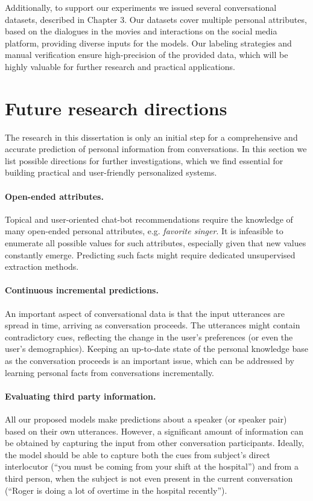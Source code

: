 \documentclass[11pt, oneside]{book}
\begin{document}
Additionally, to support our experiments we issued several conversational datasets, described in Chapter 3. Our datasets cover multiple personal attributes, based on the dialogues in the movies and interactions on the social media platform, providing diverse inputs for the models. Our labeling strategies and manual verification ensure high-precision of the provided data, which will be highly valuable for further research and practical applications.

\section{Future research directions}

The research in this dissertation is only an initial step for a comprehensive and accurate prediction of personal information from conversations. In this section we list possible directions for further investigations, which we find essential for building practical and user-friendly personalized systems.

\paragraph{Open-ended attributes.} Topical and user-oriented chat-bot recommendations require the knowledge of many open-ended personal attributes, e.g. \textit{favorite singer}. It is infeasible to enumerate all possible values for such attributes, especially given that new values constantly emerge. Predicting such facts might require dedicated unsupervised extraction methods.

\paragraph{Continuous incremental predictions.} An important aspect of conversational data is that the input utterances are spread in time, arriving as conversation proceeds. The utterances might contain contradictory cues, reflecting the change in the user's preferences (or even the user's demographics). Keeping an up-to-date state of the personal knowledge base as the conversation proceeds is an important issue, which can be addressed by learning personal facts from conversations incrementally.

\paragraph{Evaluating third party information.} All our proposed models make predictions about a speaker (or speaker pair) based on their own utterances. However, a significant amount of information can be obtained by capturing the input from other conversation participants. Ideally, the model should be able to capture both the cues from subject's direct  interlocutor (``you must be coming from your shift at the hospital'') and from a third person, when the subject is not even present in the current conversation (``Roger is doing a lot of overtime in the hospital recently''). 
\end{document}

